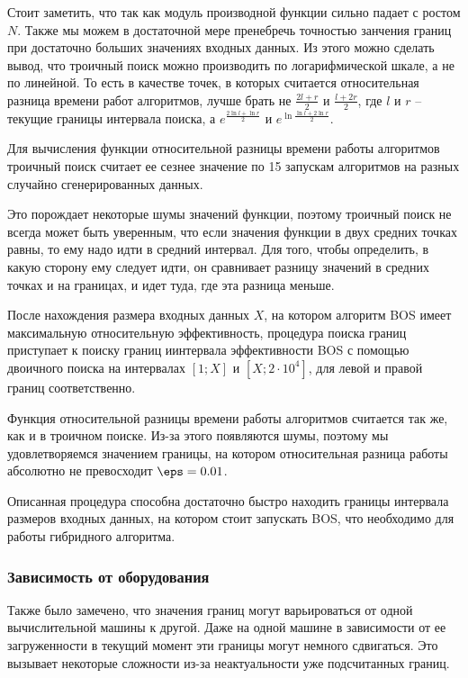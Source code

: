 Стоит заметить, что так как модуль производной функции сильно падает с ростом $N$. Также мы можем в достаточной мере
пренебречь точностью занчения границ при достаточно больших значениях входных данных. Из этого можно сделать вывод,
что троичный поиск можно производить по логарифмической шкале, а не по линейной. То есть в качестве точек, в которых
считается относительная разница времени работ алгоритмов, лучше брать не $\frac{2l + r}{2}$ и $\frac{l + 2r}{2}$, где
$l$ и $r$ -- текущие границы интервала поиска, а $e^{\frac{2\ln l + \ln r}{2}}$ и $e^{\ln\frac{\ln l + 2 \ln r}{2}}$.

Для вычисления функции относительной разницы времени работы алгоритмов троичный поиск считает ее сезнее значение по 15
запускам алгоритмов на разных случайно сгенерированных данных.

Это порождает некоторые шумы значений функции, поэтому троичный поиск не всегда может быть уверенным, что если значения
функции в двух средних точках равны, то ему надо идти в средний интервал. Для того, чтобы определить, в какую сторону
ему следует идти, он сравнивает разницу значений в средних точках и на границах, и идет туда, где эта разница меньше.

После нахождения размера входных данных $X$, на котором алгоритм BOS имеет максимальную относительную эффективность,
процедура поиска границ приступает к поиску границ иинтервала эффективности BOS с помощью двоичного поиска на
интервалах $[1;X]$ и $[X;2\cdot10^4]$, для левой и правой границ соответственно.

Функция относительной разницы времени работы алгоритмов считается так же, как и в троичном поиске. Из-за этого
появляются шумы, поэтому мы удовлетворяемся значением границы, на котором относительная разница работы абсолютно
не превосходит $\eps = 0.01$.

Описанная процедура способна достаточно быстро находить границы интервала размеров входных данных, на котором стоит
запускать BOS, что необходимо для работы гибридного алгоритма.


\subsubsection{Зависимость от оборудования}

Также было замечено, что значения границ могут варьироваться от одной вычислительной машины к другой. Даже на одной
машине в зависимости от ее загруженности в текущий момент эти границы могут немного сдвигаться. Это вызывает
некоторые сложности из-за неактуальности уже подсчитанных границ.

